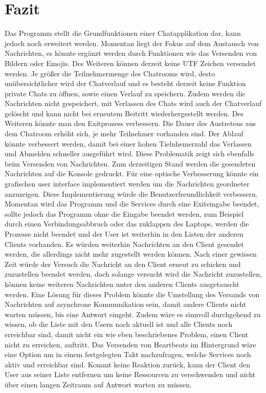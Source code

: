 \section{Fazit}
Das Programm stellt die Grundfunktionen einer Chatapplikation dar, kann jedoch noch erweitert werden. 
Momentan liegt der Fokus auf dem Austausch von Nachrichten, es könnte ergänzt werden durch Funktionen wie das Versenden von Bildern oder Emojis. Des Weiteren können derzeit keine UTF Zeichen versendet werden.
Je größer die Teilnehmermenge des Chatrooms wird, desto unübersichtlicher wird der Chatverlauf und es besteht derzeit keine 
Funktion private Chats zu öffnen, sowie einen Verlauf zu speichern. 
Zudem werden die Nachrichten nicht gespeichert, mit Verlassen des Chats wird auch der Chatverlauf gelöscht und kann nicht bei erneutem Beitritt wiederhergestellt werden.
Des Weiteren könnte man den Exitprozess verbessern. Die Dauer des Austretens aus dem Chatroom erhöht sich, je mehr Teilnehmer vorhanden sind.
Der Ablauf könnte verbessert werden, damit bei einer hohen Tielnhemerzahl das Verlassen und Abmelden schneller ausgeführt wird. 
Diese Problematik zeigt sich ebenfalls beim Versenden von Nachrichten. 
Zum derzeitigen Stand werden die gesendeten Nachrichten auf die Konsole gedruckt. Für eine optische Verbesserung könnte ein grafischen user interface implementiert werden um die Nachrichten geordneter anzuzeigen.
Diese Implementierung würde die Benutzerfreundlichkeit verbessern. 
Momentan wird das Programm und die Services durch eine Exiteingabe beendet, sollte jedoch das Programm ohne die Eingabe beendet werden, zum Beispiel durch einen Verbindungsabbruch oder das zuklappen des Laptops,
werden die Prozesse nicht beendet und der User ist weiterhin in den Listen der anderen Clients vorhanden. Es würden weiterhin Nachrichten an den Client gesendet werden, die allerdings nicht mehr zugestellt werden können.
Nach einer gewissen Zeit würde der Versuch die Nachricht an den Client erneut zu schicken und zuzustellen beendet werden, doch solange versucht wird die Nachricht zuzustellen, können keine weiteren Nachrichten 
unter den anderen Clients ausgetauscht werden. Eine Lösung für dieses Problem könnte die Umstellung des Versands von Nachrichten auf asynchrone Kommunikation sein, damit andere Clients nicht warten müssen, bis eine Antwort eingeht.
Zudem wäre es sinnvoll durchgehend zu wissen, ob die Liste mit den Usern noch aktuell ist und alle Clients noch erreichbar sind, damit nicht ein wie eben beschriebenes Problem, einen Client nicht zu erreichen, auftritt.
Das Versenden von Heartbeats im Hintergrund wäre eine Option um in einem festgelegten Takt nachzufragen, welche Services noch aktiv und erreichbar sind. 
Kommt keine Reaktion zurück, kann der Client den User aus seiner Liste entfernen um keine Ressourcen zu verschwenden und nicht über einen langen Zeitraum auf Antwort warten zu müssen.
